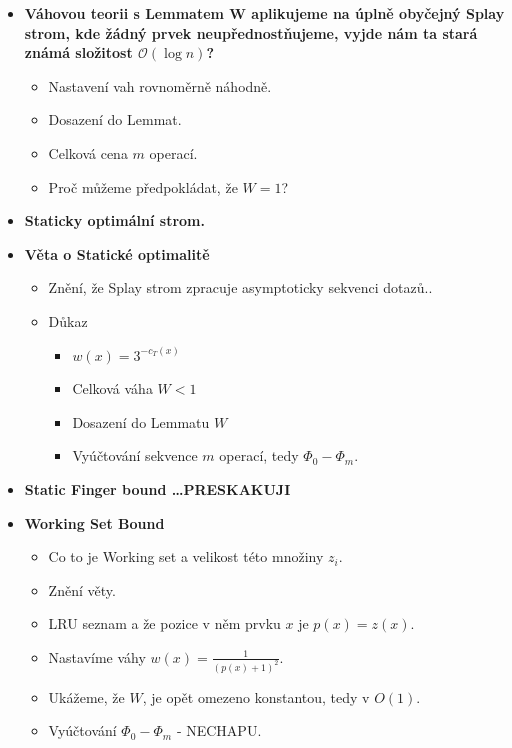 \documentclass[11pt,a4paper]{article}
\begin{document}
\begin{itemize}
\begin{itemize}
        \end{itemize}
        \item \textbf{Váhovou teorii s Lemmatem W aplikujeme na úplně obyčejný Splay strom, kde žádný prvek neupřednostňujeme, vyjde nám ta stará známá složitost $\mathcal{O}(\log n)$?}
        \begin{itemize}
            \item Nastavení vah rovnoměrně náhodně.
            \item Dosazení do Lemmat.
            \item Celková cena $m$ operací.
            \item Proč můžeme předpokládat, že $W=1$?
        \end{itemize}
        \item \textbf{Staticky optimální strom.}
        \item \textbf{Věta o Statické optimalitě}
        \begin{itemize}
            \item Znění, že Splay strom zpracuje asymptoticky sekvenci dotazů..
            \item Důkaz
            \begin{itemize}
                \item $w(x)=3^{-c_T(x)}$
                \item Celková váha $W<1$
                \item Dosazení do Lemmatu $W$
                \item Vyúčtování sekvence $m$ operací, tedy $\Phi_0 - \Phi_m$.
            \end{itemize}
        \end{itemize}
        \item \textbf{Static Finger bound \dots PRESKAKUJI}
        \item \textbf{Working Set Bound}
        \begin{itemize}
            \item Co to je Working set a velikost této množiny $z_i$.
            \item Znění věty.
            \item LRU seznam a že pozice v něm prvku $x$ je $p(x) = z(x)$.
            \item Nastavíme váhy $w(x) = \frac{1}{(p(x)+1)^2}$.
            \item Ukážeme, že $W$, je opět omezeno konstantou, tedy v $O(1)$.
            \item Vyúčtování $\Phi_0 - \Phi_m$ - NECHAPU.
        \end{itemize}
    \end{itemize}
\end{document}
